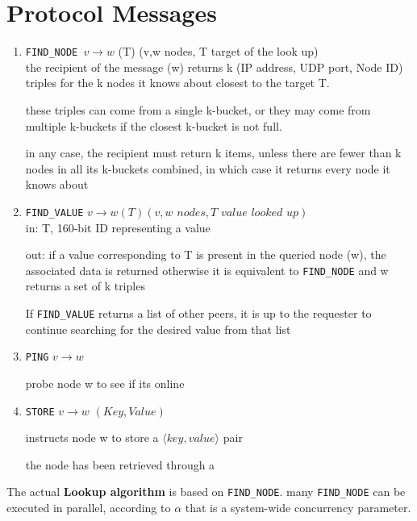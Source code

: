 \section{Protocol Messages}
\begin{enumerate}
   \item \texttt{FIND\_NODE $v\longrightarrow w$} (T) (v,w nodes, T target of the look up)\\
   the recipient of the message (w) returns k (IP address, UDP port, Node
   ID) triples for the k nodes it knows about closest to the target T.
   
   these triples can come from a single k-bucket, or they may come from multiple
   k-buckets if the closest k-bucket is not full.
   
   in any case, the recipient must return k items, unless there are fewer than k
   nodes in all its k-buckets combined, in which case it returns every node it
   knows about 



   
   \item \texttt{FIND\_VALUE} $v \longrightarrow w(T)(v,w \textit{ nodes}, T \textit{ value looked up})$\\
   in: T, 160-bit ID representing a value
   
   out:
   if a value corresponding to T is present in the queried node (w), the
   associated data is returned
   otherwise it is equivalent to \texttt{FIND\_NODE} and w returns a set of k triples
   
   If \texttt{FIND\_VALUE} returns a list of other peers, it is up to the requester to continue
   searching for the desired value from that list
   
   \item \texttt{PING} $v \longrightarrow w$
   
   probe node w to see if its online
   \item \texttt{STORE} $v \longrightarrow w$ $(Key, Value)$
   
   instructs node w to store a $\langle key, value \rangle$ pair
   
   the node has been retrieved through a
\end{enumerate}
The actual \textbf{Lookup algorithm} is based on \texttt{FIND\_NODE}.
many \texttt{FIND\_NODE} can be executed in parallel, according to $\alpha$ that is a system-wide concurrency parameter.

